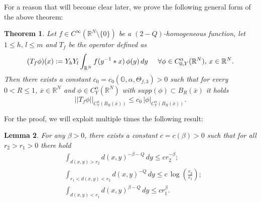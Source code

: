 \documentclass{article}
\newtheorem{theorem}{Theorem}[section]
\newtheorem{lemma}[theorem]{Lemma}
\numberwithin{equation}{section}
\begin{document}
\hspace{-7mm} For a reason that will become clear later, we prove the following general form of the above theorem:

\vspace{2mm}

\begin{theorem}
\label{C^alpha estimate for T_f phi, 3.2}
    Let $f \in C^{\infty}(\mathbb{R}^N \setminus \{0\})$ be a $(2-Q)$-homogeneous function, let $1 \leq h,\, l \leq m$ and $T_f$ be the operator defined as
    \begin{equation*}
        (T_f \phi)(x):=Y_h Y_l \int_{\mathbb{R}^N} f(y^{-1} *x) \, \phi(y) \, dy \hspace{5mm} \forall \phi \in C^{\alpha}_{0,Y}(\mathbb{R}^N), \, x \in \mathbb{R}^N.
    \end{equation*}
    Then there exists a constant $c_0=c_0(\mathbb{G}, \alpha, \Theta_{f,3})>0$ such that for every $0<R \leq 1$, $\overline{x} \in \mathbb{R}^N$ and $\phi \in C^{\alpha}_Y(\mathbb{R}^N)$ with $supp(\phi) \subset B_R(\overline{x})$ it holds
    \begin{equation*}
        ||T_f \phi||_{C^{\alpha}_Y(B_R(\overline{x}))} \leq c_0 \, |\phi|_{C^{\alpha}_Y(B_R(\overline{x}))}.
    \end{equation*}
\end{theorem}

\vspace{2mm}

\hspace{-7mm} For the proof, we will exploit multiple times the following result:

\vspace{2mm}

\begin{lemma}
\label{spherical integral lemma}
    For any $\beta>0$, there exists a constant $c=c(\beta)>0$ such that for all $r_2>r_1>0$ there hold
    \begin{align*}
        & \int_{d(x,y)>r_2} d(x,y)^{-\beta-Q} \, dy \leq c r_2^{-\beta}; \\
        & \int_{r_1<d(x,y)<r_2} d(x,y)^{-Q} \, dy \leq  c \, \log\left( \frac{r_2}{r_1} \right); \\
        & \int_{d(x,y)<r_1} d(x,y)^{\beta-Q} \, dy \leq c r_1^{\beta}.
    \end{align*}
\end{lemma}

\vspace{2mm}
\end{document}
